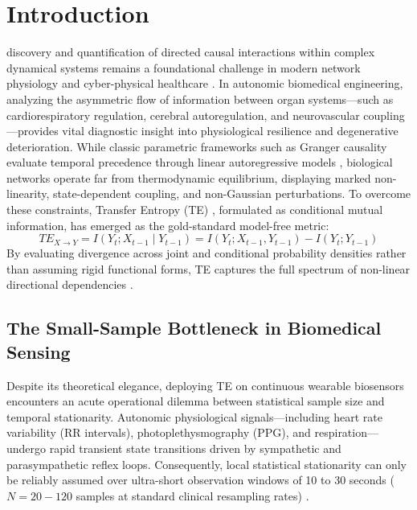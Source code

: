 \section{Introduction}

 discovery and quantification of directed causal interactions within complex dynamical systems remains a foundational challenge in modern network physiology and cyber-physical healthcare \cite{schreiber2000measuring, faes2011information, porta2012quantifying}. In autonomic biomedical engineering, analyzing the asymmetric flow of information between organ systems—such as cardiorespiratory regulation, cerebral autoregulation, and neurovascular coupling—provides vital diagnostic insight into physiological resilience and degenerative deterioration. While classic parametric frameworks such as Granger causality evaluate temporal precedence through linear autoregressive models \cite{granger1969investigating}, biological networks operate far from thermodynamic equilibrium, displaying marked non-linearity, state-dependent coupling, and non-Gaussian perturbations. To overcome these constraints, Transfer Entropy (TE) \cite{schreiber2000measuring}, formulated as conditional mutual information, has emerged as the gold-standard model-free metric:
\begin{equation}
\label{eq:te_intro}
TE_{X \to Y} = I(Y_t; X_{t-1} \mid Y_{t-1}) = I(Y_t; X_{t-1}, Y_{t-1}) - I(Y_t; Y_{t-1})
\end{equation}
By evaluating divergence across joint and conditional probability densities rather than assuming rigid functional forms, TE captures the full spectrum of non-linear directional dependencies \cite{vicente2011transfer}.

\subsection{The Small-Sample Bottleneck in Biomedical Sensing}
Despite its theoretical elegance, deploying TE on continuous wearable biosensors encounters an acute operational dilemma between statistical sample size and temporal stationarity. Autonomic physiological signals—including heart rate variability (RR intervals), photoplethysmography (PPG), and respiration—undergo rapid transient state transitions driven by sympathetic and parasympathetic reflex loops. Consequently, local statistical stationarity can only be reliably assumed over ultra-short observation windows of 10 to 30 seconds ($N = 20 - 120$ samples at standard clinical resampling rates) \cite{faes2011information}.

